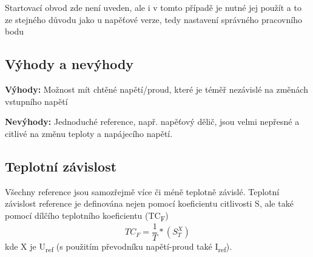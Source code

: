 Startovací obvod zde není uveden, ale i v tomto případě je nutné jej použít a to ze stejného důvodu jako u napěťové verze, tedy nastavení správného pracovního bodu















\subsection{Výhody a nevýhody}
\textbf{Výhody:} Možnost mít chtěné napětí/proud, které je téměř nezávislé na změnách vstupního napětí

\textbf{Nevýhody:} Jednoduché reference, např. napěťový dělič, jsou velmi nepřesné a citlivé na změnu teploty a napájecího napětí.

\subsection{Teplotní závislost}
Všechny reference jsou samozřejmě více či méně teplotně závislé. Teplotní závislost
reference je definována nejen pomocí koeficientu citlivosti S, ale také pomocí dílčího
teplotního koeficientu (TC\textsubscript{F})
\begin{equation}
TC_{F } = \frac{1}{T}*(S^{X}_T)
\end{equation}
kde X je U\textsubscript{ref} (s použitím převodníku napětí-proud také I\textsubscript{ref}).
